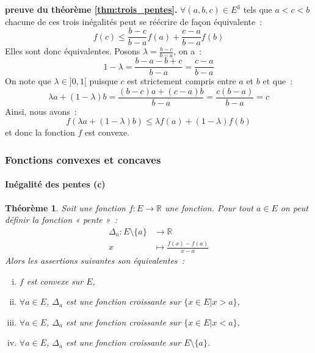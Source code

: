 \documentclass[10pt,notheorems]{beamer}
\theoremstyle{plain}
\newtheorem{theorem}{Théorème}
\theoremstyle{definition} %
\begin{document}
\begin{notes}
  \textbf{preuve du théorème \hyperlink{slide_fonctions_convexes_3}{\ref{thm:trois_pentes}}.}
  $\forall (a,b,c)\in E^3$ tels que $a<c<b$ chacune de ces trois inégalités peut se réécrire de façon équivalente~:
  \[
    f(c) \leq \frac{b-c}{b-a}f(a) + \frac{c-a}{b-a}f(b)
  \]
  Elles sont donc équivalentes. Posons $\lambda = \frac{b-c}{b-a}$, on a~:
  \[
    1-\lambda = \frac{b-a-b+c}{b-a} = \frac{c-a}{b-a}
  \]
  On note que $\lambda\in]0,1[$ puisque $c$ est strictement compris entre $a$ et $b$ et que~:
  \[
    \lambda a + (1-\lambda) b = \frac{(b-c)a+(c-a)b}{b-a} = \frac{c(b-a)}{b-a} = c
  \]
  Ainsi, nous avons~:
  \[
    f(\lambda a + (1-\lambda) b) \leq \lambda f(a) + (1-\lambda) f(b)
  \]
  et donc la fonction $f$ est convexe.
\end{notes}


\begin{frame}
  \frametitle{Fonctions convexes et concaves}
  \framesubtitle{Inégalité des pentes (c)}
  \hypertarget{slide_fonctions_convexes_5}{}

  \begin{theorem}\label{thm:pentes}
    Soit une fonction $f:E\rightarrow \mathbb R$ une fonction. Pour tout $a\in E$ on peut définir la fonction « pente »~:
    \[
      \begin{split}
        \Delta_a: E\setminus\{a\}&\rightarrow \mathbb R\\
        x &\mapsto \frac{f(x)-f(a)}{x-a}
      \end{split}
    \]
    Alors les assertions suivantes son équivalentes~:
    \begin{enumerate}[(i)]
    \item $f$ est convexe sur $E$,
    \item $\forall a\in E$, $\Delta_a$ est une fonction croissante sur $\{x\in E| x>a\}$,
    \item $\forall a\in E$, $\Delta_a$ est une fonction croissante sur $\{x\in E| x<a\}$,
    \item $\forall a\in E$, $\Delta_a$ est une fonction croissante sur $E\setminus\{a\}$.
    \end{enumerate}
  \end{theorem}

\end{frame}
\end{document}
